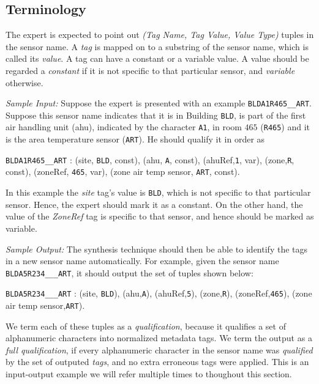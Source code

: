 \subsection{Terminology}

The expert is expected to point out \emph{(Tag Name, Tag Value, Value Type)} tuples in the sensor name. A {\it tag} is mapped on to a substring of the sensor name, which is called its {\it value}. A tag can have a constant or a variable value. A value should be regarded a \emph{constant} if it is not specific to that particular sensor, and \emph{variable} otherwise.

{\it Sample Input:} Suppose the expert is presented with an example \texttt{BLDA1R465\_\_ART}. Suppose this sensor name indicates that it is in Building \texttt{BLD}, is part of the first air handling unit (ahu), indicated by the character \texttt{A1}, in room $465$ (\texttt{R465}) and it is the area temperature sensor (\texttt{ART}). He should qualify it in order as

 \texttt{BLDA1R465\_\_ART} : (site, \texttt{BLD}, const), (ahu, \texttt{A}, const), (ahuRef,\texttt{1}, var), (zone,\texttt{R}, const), (zoneRef, \texttt{465}, var), (zone air temp sensor, \texttt{ART}, const). 

In this example the {\it site} tag's value is \texttt{BLD}, which is not specific to that particular sensor. Hence, the expert should mark it as a constant. On the other hand, the value of the {\it ZoneRef} tag is specific to that sensor, and hence should be marked as variable.

{\it Sample Output:} The synthesis technique should then be able to identify the tags in a new sensor name automatically. For example, given the sensor name \texttt{BLDA5R234\_\_\_ART}, it should output the set of tuples shown below:

\texttt{BLDA5R234\_\_\_ART} : (site, \texttt{BLD}), (ahu,\texttt{A}), (ahuRef,\texttt{5}), (zone,\texttt{R}), (zoneRef,\texttt{465}), (zone air temp sensor,\texttt{ART}).

We term each of these tuples as a {\it qualification}, because it qualifies a set of alphanumeric characters into normalized metadata tags. We term the output as a {\it full qualification}, if every alphanumeric character in the sensor name was {\it qualified} by the set of outputed {\it tags}, and no extra erroneous tags were applied. This is an input-output example we will refer multiple times to thoughout this section.

